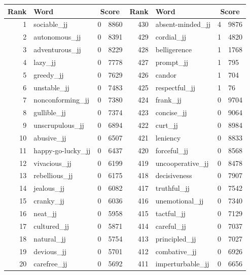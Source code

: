 \begin{table}[tbp]
    \begin{tabular}{| rlr@{.}l | rlr@{.}l |}
    \hline
    \textbf{Rank} & \textbf{Word} & \multicolumn{2}{c|}{\textbf{Score}} & \textbf{Rank} & \textbf{Word} & \multicolumn{2}{c|}{\textbf{Score}} \\
    \hline
    1 & sociable\_jj & 0 & 8860    &    430 & absent-minded\_jj & 4 & 9876 \\
    2 & autonomous\_jj & 0 & 8391    &    429 & cordial\_jj & 1 & 4820 \\
    3 & adventurous\_jj & 0 & 8229    &    428 & belligerence & 1 & 1768 \\
    4 & lazy\_jj & 0 & 7778    &    427 & prompt\_jj & 1 & 795 \\
    5 & greedy\_jj & 0 & 7629    &    426 & candor & 1 & 704 \\
    6 & unstable\_jj & 0 & 7483    &    425 & respectful\_jj & 1 & 76 \\
    7 & nonconforming\_jj & 0 & 7380    &    424 & frank\_jj & 0 & 9704 \\
    8 & gullible\_jj & 0 & 7374    &    423 & concise\_jj & 0 & 9064 \\
    9 & unscrupulous\_jj & 0 & 6894    &    422 & curt\_jj & 0 & 8984 \\
    10 & abusive\_jj & 0 & 6507    &    421 & leniency & 0 & 8833 \\
    11 & happy-go-lucky\_jj & 0 & 6437    &    420 & forceful\_jj & 0 & 8568 \\
    12 & vivacious\_jj & 0 & 6199    &    419 & uncooperative\_jj & 0 & 8478 \\
    13 & rebellious\_jj & 0 & 6175    &    418 & decisiveness & 0 & 7907 \\
    14 & jealous\_jj & 0 & 6082    &    417 & truthful\_jj & 0 & 7542 \\
    15 & cranky\_jj & 0 & 6036    &    416 & unemotional\_jj & 0 & 7340 \\
    16 & neat\_jj & 0 & 5958    &    415 & tactful\_jj & 0 & 7129 \\
    17 & cultured\_jj & 0 & 5871    &    414 & careful\_jj & 0 & 7037 \\
    18 & natural\_jj & 0 & 5754    &    413 & principled\_jj & 0 & 7027 \\
    19 & devious\_jj & 0 & 5701    &    412 & combative\_jj & 0 & 6926 \\
    20 & carefree\_jj & 0 & 5692    &    411 & imperturbable\_jj & 0 & 6656 \\

\end{tabular}
\end{table}
